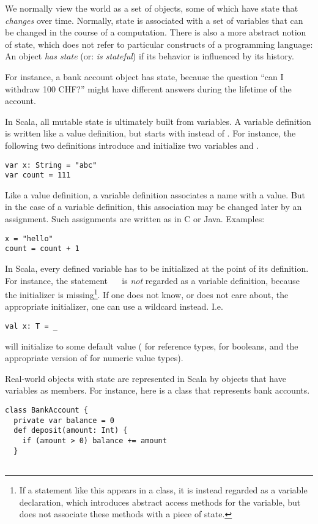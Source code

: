 {We normally view the world as a set of objects, some of which have
state that {\em changes} over time.  Normally, state is associated
with a set of variables that can be changed in the course of a
computation.  There is also a more abstract notion of state, which
does not refer to particular constructs of a programming language: An
object {\em has state} (or: {\em is stateful}) if its behavior is
influenced by its history.

For instance, a bank account object has state, because the question
``can I withdraw 100 CHF?''
might have different answers during the lifetime of the account.

In Scala, all mutable state is ultimately built from variables.  A
variable definition is written like a value definition, but starts
with \verb@var@ instead of \verb@val@. For instance, the following two
definitions introduce and initialize two variables  and
.
\begin{lstlisting}
var x: String = "abc"
var count = 111
\end{lstlisting}
Like a value definition, a variable definition associates a name with
a value. But in the case of a variable definition, this association
may be changed later by an assignment.  Such assignments are written
as in C or Java. Examples:
\begin{lstlisting}
x = "hello"
count = count + 1
\end{lstlisting}
In Scala, every defined variable has to be initialized at the point of
its definition. For instance, the statement ~~ is
{\em not} regarded as a variable definition, because the initializer
is missing\footnote{If a statement like this appears in a class, it is
instead regarded as a variable declaration, which introduces
abstract access methods for the variable, but does not associate these
methods with a piece of state.}. If one does not know, or does not
care about, the appropriate initializer, one can use a wildcard
instead. I.e.
\begin{lstlisting}
val x: T = _
\end{lstlisting}
will initialize  to some default value ( for
reference types,  for booleans, and the appropriate
version of  for numeric value types).

Real-world objects with state are represented in Scala by objects that
have variables as members. For instance, here is a class that
represents bank accounts.
\begin{lstlisting}
class BankAccount {
  private var balance = 0
  def deposit(amount: Int) {
    if (amount > 0) balance += amount
  }


\end{lstlisting}}

